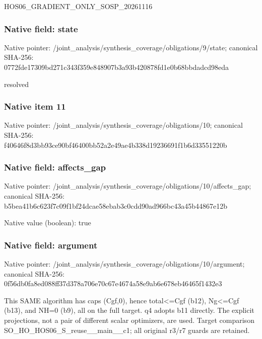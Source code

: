 \documentclass[10pt,a4paper]{article}
\begin{document}
\begingroup\raggedright\sloppy HOS06\_\allowbreak{}GRADIENT\_\allowbreak{}ONLY\_\allowbreak{}SOSP\_\allowbreak{}20261116\par\endgroup

\subsubsection{Native field: state}
Native pointer: /joint\_\allowbreak{}analysis/synthesis\_\allowbreak{}coverage/obligations/9/state; canonical SHA-256: 0772fde17309bd271c343f359e848907b3a93b420878fd1e0b68bbdadcd98eda

\begingroup\raggedright\sloppy resolved\par\endgroup

\subsubsection{Native item 11}
Native pointer: /joint\_\allowbreak{}analysis/synthesis\_\allowbreak{}coverage/obligations/10; canonical SHA-256: f40646f8d3bb93ce90bf46400bb52a2e49ae4b338d19236691f1b6d33551220b

\subsubsection{Native field: affects\_\allowbreak{}gap}
Native pointer: /joint\_\allowbreak{}analysis/synthesis\_\allowbreak{}coverage/obligations/10/affects\_\allowbreak{}gap; canonical SHA-256: b5bea41b6c623f7c09f1bf24dcae58ebab3c0cdd90ad966bc43a45b44867e12b

Native value (boolean): true

\subsubsection{Native field: argument}
Native pointer: /joint\_\allowbreak{}analysis/synthesis\_\allowbreak{}coverage/obligations/10/argument; canonical SHA-256: 0f56db0fa8ed088ff37d378a706e70c67e4674a58e9ab6e678eb46465f1432e3

\begingroup\raggedright\sloppy This SAME algorithm has caps (Cgf,\allowbreak{}0),\allowbreak{} hence total<=\allowbreak{}Cgf (b12),\allowbreak{} Ng<=\allowbreak{}Cgf (b13),\allowbreak{} and NH=\allowbreak{}0 (b9),\allowbreak{} all on the full target. q4 adopts b11 directly. The explicit projections,\allowbreak{} not a pair of different scalar optimizers,\allowbreak{} are used. Target comparison SO\_\allowbreak{}HO\_\allowbreak{}HOS06\_\allowbreak{}S\_\allowbreak{}reuse\_\allowbreak{}\_\allowbreak{}main\_\allowbreak{}\_\allowbreak{}c1;\allowbreak{} all original r3/\allowbreak{}r7 guards are retained.\par\endgroup
\end{document}
